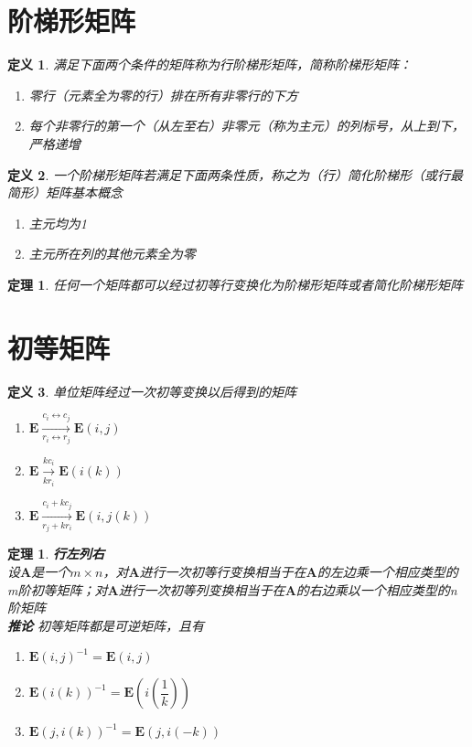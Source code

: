 \documentclass[a4paper]{ctexbook}
\newtheorem{definition}{定义}[section]
\newtheorem{theorem}[section]{定理}
\begin{document}
\section{阶梯形矩阵}
\begin{definition}
    满足下面两个条件的矩阵称为行阶梯形矩阵，简称阶梯形矩阵：
\begin{enumerate}
    \item 零行（元素全为零的行）排在所有非零行的下方
    \item 每个非零行的第一个（从左至右）非零元（称为主元）的列标号，从上到下，严格递增
\end{enumerate}
\end{definition}
\begin{definition}
    一个阶梯形矩阵若满足下面两条性质，称之为（行）简化阶梯形（或行最简形）矩阵基本概念
\begin{enumerate}
    \item 主元均为1
    \item 主元所在列的其他元素全为零
\end{enumerate}
\end{definition}



\begin{theorem}
    任何一个矩阵都可以经过初等行变换化为阶梯形矩阵或者简化阶梯形矩阵
\end{theorem}

\section{初等矩阵}
\begin{definition}
单位矩阵经过一次初等变换以后得到的矩阵
\begin{enumerate}
    \item \(\mathbf{E}\xrightarrow[r_i\leftrightarrow r_j]{c_i\leftrightarrow c_j}\mathbf{E}(i,j)\)
    \item \(\mathbf{E}\xrightarrow[kr_i]{kc_i}\mathbf{E}(i(k))\)
    \item \(\mathbf{E}\xrightarrow[r_j+kr_i]{c_i+kc_j}\mathbf{E}(i,j(k))\)
\end{enumerate}
\end{definition}

\begin{theorem}
    \textbf{行左列右}
    \\设\(\mathbf{A}\)是一个\(m \times n\)，对\(\mathbf{A}\)进行一次初等行变换相当于在\(\mathbf{A}\)的左边乘一个相应类型的m阶初等矩阵；对\(\mathbf{A}\)进行一次初等列变换相当于在\(\mathbf{A}\)的右边乘以一个相应类型的n阶矩阵
    \\ \textbf{推论}
    初等矩阵都是可逆矩阵，且有
    \begin{enumerate}
        \item \(\mathbf{E}(i,j)^{-1}=\mathbf{E}(i,j)\)
        \item \(\mathbf{E}(i(k))^{-1}=\mathbf{E}(i(\dfrac{1}{k}))\)
        \item \(\mathbf{E}(j,i(k))^{-1}=\mathbf{E}(j,i(-k))\)
    \end{enumerate}
\end{theorem}
\end{document}
